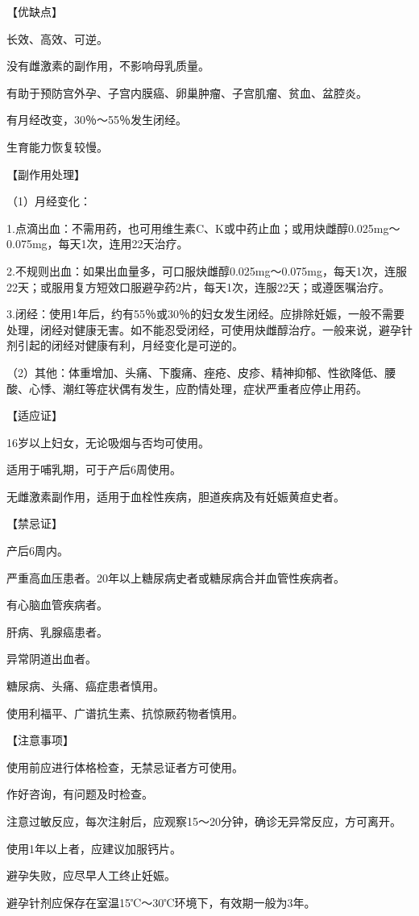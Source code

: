 \documentclass[12pt,UTF8,openany]{ctexbook}
\begin{document}
【优缺点】

长效、高效、可逆。

没有雌激素的副作用，不影响母乳质量。

有助于预防宫外孕、子宫内膜癌、卵巢肿瘤、子宫肌瘤、贫血、盆腔炎。

有月经改变，30％～55％发生闭经。

生育能力恢复较慢。

【副作用处理】

（1）月经变化：

1.点滴出血：不需用药，也可用维生素C、K或中药止血；或用炔雌醇0.025mg～0.075mg，每天1次，连用22天治疗。

2.不规则出血：如果出血量多，可口服炔雌醇0.025mg～0.075mg，每天1次，连服22天；或服用复方短效口服避孕药2片，每天1次，连服22天；或遵医嘱治疗。

3.闭经：使用1年后，约有55％或30％的妇女发生闭经。应排除妊娠，一般不需要处理，闭经对健康无害。如不能忍受闭经，可使用炔雌醇治疗。一般来说，避孕针剂引起的闭经对健康有利，月经变化是可逆的。

（2）其他：体重增加、头痛、下腹痛、痤疮、皮疹、精神抑郁、性欲降低、腰酸、心悸、潮红等症状偶有发生，应酌情处理，症状严重者应停止用药。

【适应证】

16岁以上妇女，无论吸烟与否均可使用。

适用于哺乳期，可于产后6周使用。

无雌激素副作用，适用于血栓性疾病，胆道疾病及有妊娠黄疸史者。

【禁忌证】

产后6周内。

严重高血压患者。20年以上糖尿病史者或糖尿病合并血管性疾病者。

有心脑血管疾病者。

肝病、乳腺癌患者。

异常阴道出血者。

糖尿病、头痛、癌症患者慎用。

使用利福平、广谱抗生素、抗惊厥药物者慎用。

【注意事项】

使用前应进行体格检查，无禁忌证者方可使用。

作好咨询，有问题及时检查。

注意过敏反应，每次注射后，应观察15～20分钟，确诊无异常反应，方可离开。

使用1年以上者，应建议加服钙片。

避孕失败，应尽早人工终止妊娠。

避孕针剂应保存在室温15℃～30℃环境下，有效期一般为3年。
\end{document}
